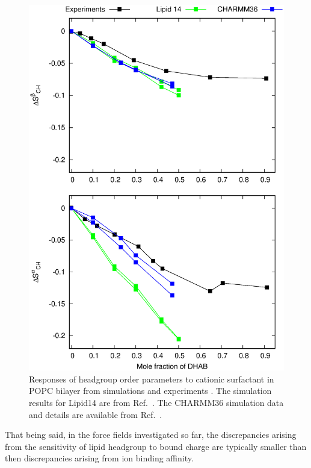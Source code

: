 \documentclass[journal=jpcbfk,manuscript=article]{achemso}
\begin{document}
\begin{figure}[]
  \centering
  \includegraphics[width=14.0cm]{../Figs/HGopsDHMDMAB.eps}
  \caption{\label{CHANGESwithDHMDMAB}
  Responses of headgroup order parameters to cationic surfactant in
  POPC bilayer from simulations and experiments \cite{scherer89}.
  The simulation results for Lipid14 are from Ref.~.
  The CHARMM36 simulation data and details are available from Ref.~.
}
\end{figure}

That being said, in the force fields investigated so far, the discrepancies arising from the sensitivity of lipid headgroup to
bound charge are typically smaller than then discrepancies arising from ion binding affinity.

\pagebreak
\end{document}
